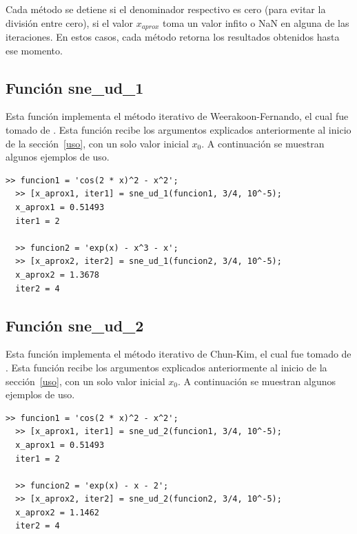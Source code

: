 \documentclass[12pt]{article}
\begin{document}
Cada método se detiene si el denominador respectivo es cero (para evitar la división entre cero), si el valor $x_{aprox}$ toma un valor infito o NaN en alguna de las iteraciones. En estos casos, cada método retorna los resultados obtenidos hasta ese momento.

\subsection{Función sne\_ud\_1}
Esta función implementa el método iterativo de Weerakoon-Fernando, el cual fue tomado de \cite{kiran2015performance}. Esta función recibe los argumentos explicados anteriormente al inicio de la sección~\ref{uso}, con un solo valor inicial $x_{0}$. A continuación se muestran algunos ejemplos de uso.

\begin{minipage}{\linewidth}
\begin{lstlisting}[frame = single]
  >> funcion1 = 'cos(2 * x)^2 - x^2';
  >> [x_aprox1, iter1] = sne_ud_1(funcion1, 3/4, 10^-5);
  x_aprox1 = 0.51493
  iter1 = 2

  >> funcion2 = 'exp(x) - x^3 - x';
  >> [x_aprox2, iter2] = sne_ud_1(funcion2, 3/4, 10^-5);
  x_aprox2 = 1.3678
  iter2 = 4

\end{lstlisting}
\end{minipage}

\subsection{Función sne\_ud\_2}
Esta función implementa el método iterativo de Chun-Kim, el cual fue tomado de \cite{kiran2015performance}. Esta función recibe los argumentos explicados anteriormente al inicio de la sección~\ref{uso}, con un solo valor inicial $x_{0}$. A continuación se muestran algunos ejemplos de uso.

\begin{minipage}{\linewidth}
\begin{lstlisting}[frame = single]
  >> funcion1 = 'cos(2 * x)^2 - x^2';
  >> [x_aprox1, iter1] = sne_ud_2(funcion1, 3/4, 10^-5);
  x_aprox1 = 0.51493
  iter1 = 2

  >> funcion2 = 'exp(x) - x - 2';
  >> [x_aprox2, iter2] = sne_ud_2(funcion2, 3/4, 10^-5);
  x_aprox2 = 1.1462
  iter2 = 4

\end{lstlisting}
\end{minipage}
\end{document}

